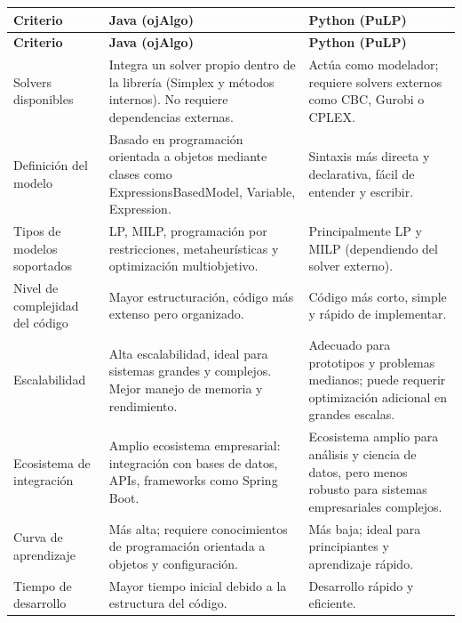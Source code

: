 \documentclass[12pt,a4paper]{article}
\begin{document}
\small
\setlength{\LTpre}{0pt}
\setlength{\LTpost}{0pt}
\begin{longtable}{|>{\raggedright\arraybackslash}p{}|>{\raggedright\arraybackslash}p{}|>{\raggedright\arraybackslash}p{}|}
	\hline
	\textbf{Criterio} & \textbf{Java (ojAlgo)} & \textbf{Python (PuLP)} \\
	\hline
	\endfirsthead

	\hline
	\textbf{Criterio} & \textbf{Java (ojAlgo)} & \textbf{Python (PuLP)} \\
	\hline
	\endhead

	\hline
	\endfoot

	\hline
	\endlastfoot

	Solvers disponibles & Integra un solver propio dentro de la librería (Simplex y métodos internos). No requiere dependencias externas. & Actúa como modelador; requiere solvers externos como CBC, Gurobi o CPLEX. \\
		\hline
		Definición del modelo & Basado en programación orientada a objetos mediante clases como ExpressionsBasedModel, Variable, Expression. & Sintaxis más directa y declarativa, fácil de entender y escribir. \\
		\hline
		Tipos de modelos soportados & LP, MILP, programación por restricciones, metaheurísticas y optimización multiobjetivo. & Principalmente LP y MILP (dependiendo del solver externo). \\
		\hline
		Nivel de complejidad del código & Mayor estructuración, código más extenso pero organizado. & Código más corto, simple y rápido de implementar. \\
		\hline
		Escalabilidad & Alta escalabilidad, ideal para sistemas grandes y complejos. Mejor manejo de memoria y rendimiento. & Adecuado para prototipos y problemas medianos; puede requerir optimización adicional en grandes escalas. \\
		\hline
		Ecosistema de integración & Amplio ecosistema empresarial: integración con bases de datos, APIs, frameworks como Spring Boot. & Ecosistema amplio para análisis y ciencia de datos, pero menos robusto para sistemas empresariales complejos. \\
		\hline
		Curva de aprendizaje & Más alta; requiere conocimientos de programación orientada a objetos y configuración. & Más baja; ideal para principiantes y aprendizaje rápido. \\
		\hline
		Tiempo de desarrollo & Mayor tiempo inicial debido a la estructura del código. & Desarrollo rápido y eficiente. \\

\end{longtable}
\end{document}

